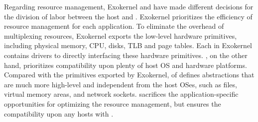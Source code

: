 Regarding resource management,
Exokernel and \graphene{} have made different decisions for
the division of labor
between the host and \libos{}. %
Exokernel prioritizes the efficiency of resource management for each application. 
To eliminate the overhead of multiplexing resources,
Exokernel exports the low-level hardware primitives, including physical memory, CPU, disks, TLB and page tables. 
Each \libos{} in Exokernel contains drivers to directly interfacing
these hardware primitives.
\graphene{}, on the other hand, prioritizes compatibility upon plenty of host OS and hardware platforms.
Compared with the primitives exported by Exokernel,
\thehostabi{} of \graphene{} defines abstractions
that are much more high-level and independent from the host OSes, such as files, virtual memory areas, and network sockets.
\graphene{} sacrifices the application-specific opportunities
for optimizing the resource management,
but ensures the compatibility upon any hosts with \thehostabi{}.




















